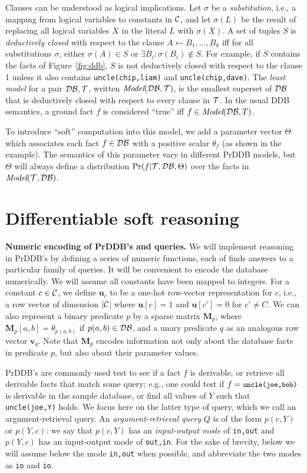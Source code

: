 \documentclass{article}
\newcommand{\cd}[1]{{\small \texttt{#1}}}
\newcommand{\mysubsection}[1]{\textbf{{#1}.}}
\newcommand{\trm}[1]{\textit{#1}}
\newcommand{\vek}[1]{\textbf{#1}}
\newcommand{\M}{\textbf{M}}
\newcommand{\model}{\textit{Model}}
\newcommand{\C}{{\cal{C}}}
\newcommand{\T}{{\cal{T}}}
\newcommand{\DB}{{\cal{DB}}}
\begin{document}
Clauses can be understood as logical implications.  Let $\sigma$ be a
\trm{substitution}, i.e., a mapping from logical variables to
constants in $\C$, and let $\sigma(L)$ be the result of replacing all
logical variables $X$ in the literal $L$ with $\sigma(X)$.  A set of
tuples $S$ is \trm{deductively closed} with respect to the clause
$A\leftarrow{}B_1,\ldots,B_k$ iff for all substitutions $\sigma$,
either $\sigma(A) \in {}S$ or $\exists B_i:\sigma(B_i)\not\in{}S$.
For example, if $S$ contains the facts of Figure~\ref{fig:ddb}, $S$ is
not deductively closed with respect to the clause 1 unless it also
contains \cd{uncle(chip,liam)} and \cd{uncle(chip,dave)}.  The
\trm{least model} for a pair $\DB,\T$, written $\model(\DB,\T)$, is
the smallest superset of $\DB$ that is deductively closed with respect
to every clause in $\T$.  In the usual DDB semantics, a ground fact
$f$ is considered ``true'' iff $f\in\model(\DB,T)$.

To introduce ``soft'' computation into this model, we add a parameter
vector $\Theta$ which associates each fact $f\in\DB$ with a positive
scalar $\theta_f$ (as shown in the example).  The semantics of this
parameter vary in different PrDDB models, but $\Theta$ will always
define a distribution $\Pr(f|\T,\DB,\Theta)$ over the facts in
$\model(\T,\DB)$.

\section{Differentiable soft reasoning}

\mysubsection{Numeric encoding of PrDDB's and queries}
We will implement reasoning in PrDDB's by defining a series of numeric
functions, each of finds answers to a particular family of queries.
It will be convenient to encode the database numerically. We will
assume all constants have been mapped to integers.  For a constant
$c\in\C$, we define $\vek{u}_c$ to be a one-hot row-vector
representation for $c$, i.e., a row vector of dimension $|\C$| where
$\vek{u}[c]=1$ and $\vek{u}[c']=0$ for $c'\not=C$.  We can also
represent a binary predicate $p$ by a sparse matrix $\M_p$, where
$\M_p[a,b]=\theta_{p(a,b)}$ if $p(a,b)\in\DB$, and a unary predicate
$q$ as an analogous row vector $\vek{v}_q$.  Note that $\M_p$ encodes
information not only about the database facts in predicate $p$, but
also about their parameter values.

PrDDB's are commonly used test to see if a fact $f$ is derivable, or
retrieve all derivable facts that match some query: e.g., one could
test if $f=\cd{uncle(joe,bob)}$ is derivable in the sample database,
or find all values of $Y$ such that \cd{uncle(joe,Y)} holds.  We focus
here on the latter type of query, which we call an {argument-retrieval
  query}.  An \trm{argument-retrieval query} $Q$ is of the form
$p(c,Y)$ or $p(Y,c)$: we say that $p(c,Y)$ has an \trm{input-output
  mode} of \cd{in,out} and $p(Y,c)$ has an input-output mode of
\cd{out,in}. For the sake of brevity, below we will assume below the
mode \cd{in,out} when possible, and abbreviate the two modes as
\cd{io} and \cd{io}.
\end{document}

